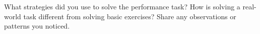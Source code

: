 \documentclass[12pt]{article}
\begin{document}
\begin{tcolorbox}[colframe=black!60, colback=white, 
coltitle=black, colbacktitle=black!15, fonttitle=\bfseries\Large, 
title=Reflection, halign title=center, left=10pt, right=10pt, top=10pt, bottom=80pt]
What strategies did you use to solve the performance task? How is solving a real-world task different from solving basic exercises? Share any observations or patterns you noticed.

\vspace{1cm}
\end{tcolorbox}
\end{document}
